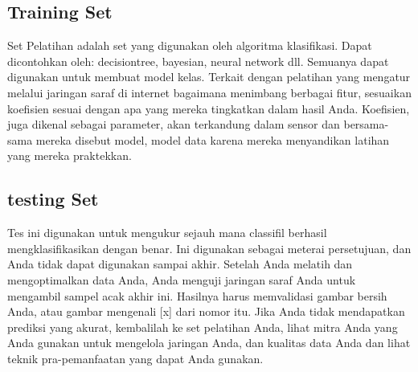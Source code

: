 \subsection{Training Set}
Set Pelatihan adalah set yang digunakan oleh algoritma klasifikasi. Dapat dicontohkan oleh: decisiontree, bayesian, neural network dll. Semuanya dapat digunakan untuk membuat model kelas. Terkait dengan pelatihan yang mengatur melalui jaringan saraf di internet bagaimana menimbang berbagai fitur, sesuaikan koefisien sesuai dengan apa yang mereka tingkatkan dalam hasil Anda. Koefisien, juga dikenal sebagai parameter, akan terkandung dalam sensor dan bersama-sama mereka disebut model, model data karena mereka menyandikan latihan yang mereka praktekkan. 
\subsection{testing Set}
Tes ini digunakan untuk mengukur sejauh mana classifil berhasil mengklasifikasikan dengan benar. Ini digunakan sebagai meterai persetujuan, dan Anda tidak dapat digunakan sampai akhir. Setelah Anda melatih dan mengoptimalkan data Anda, Anda menguji jaringan saraf Anda untuk mengambil sampel acak akhir ini. Hasilnya harus memvalidasi gambar bersih Anda, atau gambar mengenali [x] dari nomor itu. Jika Anda tidak mendapatkan prediksi yang akurat, kembalilah ke set pelatihan Anda, lihat mitra Anda yang Anda gunakan untuk mengelola jaringan Anda, dan kualitas data Anda dan lihat teknik pra-pemanfaatan yang dapat Anda gunakan.
